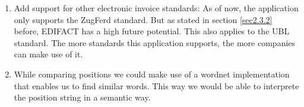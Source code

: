 \begin{enumerate}
	\item Add support for other electronic invoice standards: As of now, the application only supports the ZugFerd standard. But as stated in section \ref{sec2.3.2} before, EDIFACT has a high future potential. This also applies to the UBL standard. The more standards this application supports, the more companies can make use of it.
	\item While comparing positions we could make use of a wordnet implementation that enables us to find similar words. This way we would be able to interprete the position string in a semantic way.
\end{enumerate}